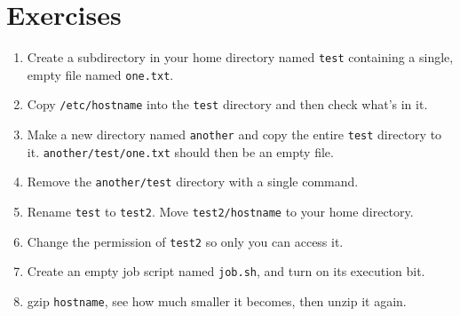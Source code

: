 \begin{prompt}
\end{prompt}

\section{Exercises}

\begin{enumerate}
    \item Create a subdirectory in your home directory named \verb|test| containing
        a single, empty file named \verb|one.txt|.
    \item Copy \verb|/etc/hostname| into the \verb|test| directory and then check what's
        in it.
    \item Make a new directory named \verb|another| and copy the entire \verb|test|
        directory to it. \verb|another/test/one.txt| should then be an empty file.
    \item Remove the \verb|another/test| directory with a single command.
    \item Rename \verb|test| to \verb|test2|. Move \verb|test2/hostname| to your
        home directory.
    \item Change the permission of \verb|test2| so only you can access it.
    \item Create an empty job script named \verb|job.sh|, and turn on its execution bit.
    \item gzip \verb|hostname|, see how much smaller it becomes, then unzip it again.
\end{enumerate}
